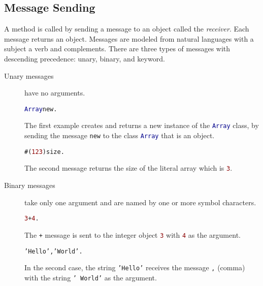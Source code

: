 \subsection{Message Sending}

A method is called by sending a message to an object called the \emph{receiver}.
Each message returns an object.
Messages are modeled from natural languages with a subject a verb and complements. There are three types of messages with descending precedence: unary, binary, and keyword.

\begin{description}
\item[Unary messages] have no arguments.

\begin{alltt}
\textcolor{darkBlue}{Array} new.
\end{alltt}

The first example creates and returns a new instance of the \textcolor{darkBlue}{\texttt{Array}} class, by sending the message \texttt{new} to the class
\textcolor{darkBlue}{\texttt{Array}} that is an object.

\begin{alltt}
#(\textcolor{darkRed}{1 2 3}) size.
\end{alltt}

The second message returns the size of the literal array which is \textcolor{darkRed}{\texttt{3}}.

\item[Binary messages] take only one argument and are named by one or more symbol characters.

\begin{alltt}
\textcolor{darkRed}{3} + \textcolor{darkRed}{4}.
\end{alltt}

The \texttt{+} message is sent to the integer object \textcolor{darkRed}{\texttt{3}} with \textcolor{darkRed}{\texttt{4}} as the argument.

\begin{alltt}
\textcolor{string}{'Hello'}, \textcolor{string}{' World'}.
\end{alltt}

In the second case, the string \textcolor{string}{\texttt{'Hello'}} receives the message \texttt{,} (comma) with the string \textcolor{string}{\texttt{'~World'}} as the argument.


\end{description}
